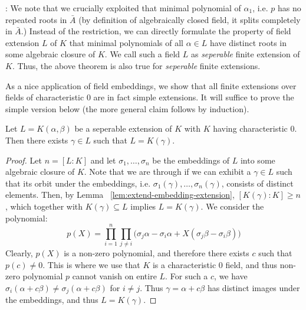 \documentclass[11pt]{article}
\begin{document}
: We note that we crucially exploited that minimal polynomial of $\alpha_1$, i.e. $p$ has no repeated roots in $\bar{A}$ (by definition
of algebraically closed field, it splits completely in $\bar{A}$.) Instead of the restriction, we can directly formulate the property of field extension
$L$ of $K$ that minimal polynomials of all $\alpha\in L$ have distinct roots in some algebraic closure of $K$. We call such a field $L$ as
{\em seperable} finite extension of $K$. Thus, the above theorem is also true for {\em seperable} finite extensions.


As a nice application of field embeddings, we show that all finite extensions over fields of characteristic $0$ are in fact simple extensions. It will
suffice to prove the simple version below (the more general claim follows by induction).

\begin{lemma}\label{lem:simple-extension}
Let $L=K(\alpha,\beta)$ be a seperable extension of $K$ with $K$ having characteristic $0$. Then there exists $\gamma\in L$ such that $L=K(\gamma)$.
\end{lemma}
\begin{proof}
Let $n=[L:K]$ and let $\sigma_1,\ldots,\sigma_n$ be the embeddings of $L$ into some algebraic closure of $K$. Note that we are through
if we can exhibit a $\gamma\in L$ such that its orbit under the embeddings, i.e. $\sigma_1(\gamma),\ldots,\sigma_n(\gamma)$, consists of
distinct elements. Then, by Lemma ~\ref{lem:extend-embedding-extension}, $[K(\gamma):K]\geq n$, which together with $K(\gamma)\subseteq L$
implies $L=K(\gamma)$. We consider the polynomial:
\begin{equation*}
p(X) = \prod_{i=1}^n \prod_{j\neq i}\big(\sigma_j\alpha -\sigma_i \alpha + X(\sigma_j \beta -\sigma_i\beta)\big)
\end{equation*}
Clearly, $p(X)$ is a non-zero polynomial, and therefore there exists $c$ such that $p(c)\neq 0$. This is where we use that $K$ is a characteristic
$0$ field, and thus non-zero polynomial $p$ cannot vanish on entire $L$. For such a $c$, we have $\sigma_i(\alpha + c\beta)\neq \sigma_j(\alpha+c\beta)$
for $i\neq j$. Thus $\gamma=\alpha+c\beta$ has distinct images under the embeddings, and thus $L=K(\gamma)$.
\end{proof}
\end{document}
